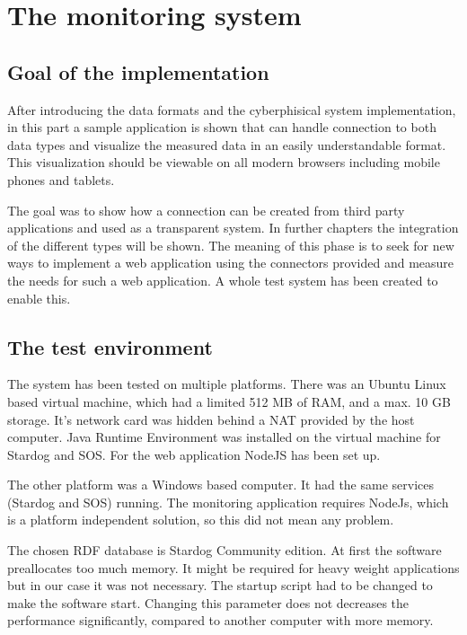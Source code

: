 \chapter{The monitoring system}
\section{Goal of the implementation}

After introducing the data formats and the cyberphisical system implementation, in this part a sample application is shown that can handle connection to both data types and visualize the measured data in an easily understandable format. This visualization should be viewable on all modern browsers including mobile phones and tablets.

The goal was to show how a connection can be created from third party applications and used as a transparent system. In further chapters the integration of the different types will be shown. The meaning of this phase is to seek for new ways to implement a web application using the connectors provided and measure the needs for such a web application. A whole test system has been created to enable this.

\section{The test environment}

The system has been tested on multiple platforms. There was an Ubuntu Linux based virtual machine, which had a limited 512 MB of RAM, and a max. 10 GB storage. It's network card was hidden behind a NAT provided by the host computer. Java Runtime Environment was installed on the virtual machine for Stardog and SOS. For the web application NodeJS has been set up. 

The other platform was a Windows based computer. It had the same services (Stardog and SOS) running. The monitoring application requires NodeJs, which is a platform independent solution, so this did not mean any problem.

The chosen RDF database is Stardog Community edition. At first the software preallocates too much memory. It might be required for heavy weight applications but in our case it was not necessary.  The startup script had to be changed to make the software start. Changing this parameter does not decreases the performance significantly, compared to another computer with more memory. 

